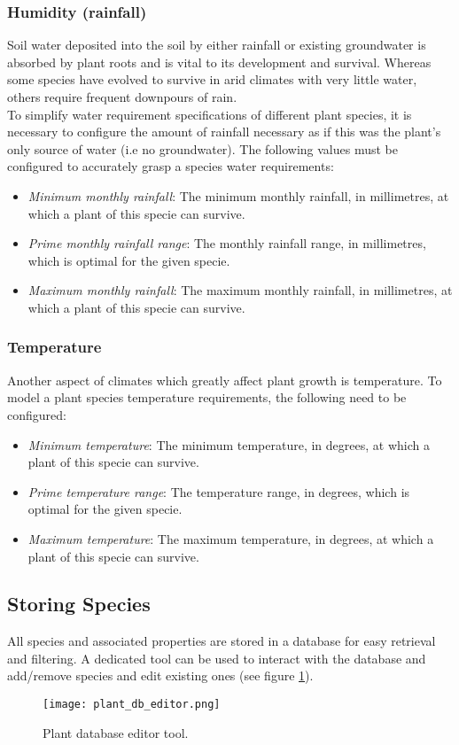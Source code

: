 \subsubsection{Humidity (rainfall)}

Soil water deposited into the soil by either rainfall or existing groundwater is absorbed by plant roots and is vital to its development and survival. Whereas some species have evolved to survive in arid climates with very little water, others require frequent downpours of rain. \\
To simplify water requirement specifications of different plant species, it is necessary to configure the amount of rainfall necessary as if this was the plant's only source of water (i.e no groundwater). The following values must be configured to accurately grasp a species water requirements:

\begin{itemize}
\item \textit{Minimum monthly rainfall}: The minimum monthly rainfall, in millimetres, at which a plant of this specie can survive.
\item \textit{Prime monthly rainfall range}: The monthly rainfall range, in millimetres, which is optimal for the given specie.
\item \textit{Maximum monthly rainfall}: The maximum monthly rainfall, in millimetres, at which a plant of this specie can survive.\end{itemize}

\subsubsection{Temperature}

Another aspect of climates which greatly affect plant growth is temperature. To model a plant species temperature requirements, the following need to be configured:

\begin{itemize}
\item \textit{Minimum temperature}: The minimum temperature, in degrees, at which a plant of this specie can survive.
\item \textit{Prime temperature range}: The temperature range, in degrees, which is optimal for the given specie.
\item \textit{Maximum temperature}: The maximum temperature, in degrees, at which a plant of this specie can survive.
\end{itemize}

\subsection{Storing Species}

All species and associated properties are stored in a database for easy retrieval and filtering. A dedicated tool can be used to interact with the database and add/remove species and edit existing ones (see figure \ref{fig:plant_db_editor}).

\begin{figure}
\center
	\texttt{[image: plant\_db\_editor.png]}
	\caption{ Plant database editor tool.}	
	\label{fig:plant_db_editor}
\end{figure}

